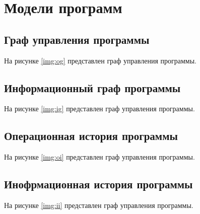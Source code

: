 \section{Модели программ}

\subsection{Граф управления программы}

На рисунке \ref{img:og} представлен граф управления программы.


\clearpage


\subsection{Информационный граф программы}

На рисунке \ref{img:ig} представлен граф управления программы.


\clearpage

\subsection{Операционная история программы}

На рисунке \ref{img:oi} представлен граф управления программы.


\clearpage

\subsection{Инофрмационная история программы}

На рисунке \ref{img:ii} представлен граф управления программы.


\clearpage



